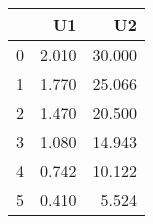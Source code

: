 \begin{tabular}{lrr}
\toprule
{} &     U1 &      U2 \\
\midrule
0 &  2.010 &  30.000 \\
1 &  1.770 &  25.066 \\
2 &  1.470 &  20.500 \\
3 &  1.080 &  14.943 \\
4 &  0.742 &  10.122 \\
5 &  0.410 &   5.524 \\
\bottomrule
\end{tabular}
